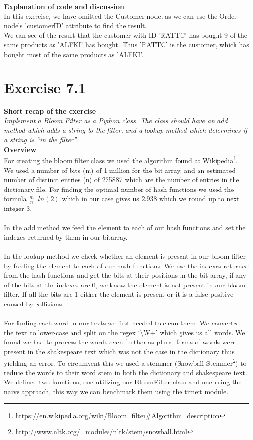 \documentclass{article}
\begin{document}
~\\
\textbf{Explanation of code and discussion}\\
In this exercise, we have omitted the Customer node, as we can use the Order node's 'customerID' attribute to find the result. 
~\\
We can see of the result that the customer with ID 'RATTC' has bought 9 of the same products as 'ALFKI' has bought. Thus 'RATTC' is the customer, which has bought most of the same products as 'ALFKI'. 

\section{Exercise 7.1}
\textbf{Short recap of the exercise}\\
\textit{Implement a Bloom Filter as a Python class. The class should have an add method which adds a string to the filter, and a lookup method which determines if a string is “in the filter”.}\\

\textbf{Overview}\\
For creating the bloom filter class we used the algorithm found at Wikipedia\footnote{\url{https://en.wikipedia.org/wiki/Bloom_filter#Algorithm_description}}.\\
We used a number of bits (m) of 1 million for the bit array, and an estimated number of distinct entries (n) of 235887 which are the number of entries in the dictionary file.
For finding the optimal number of hash functions we used the formula $\frac{m}{n} \cdot ln(2)$ which in our case gives us $2.938$ which we round up to next integer $3$.\\\\
In the add method we feed the element to each of our hash functions and set the indexes returned by them in our bitarray.\\\\
In the lookup method we check whether an element is present in our bloom filter by feeding the element to each of our hash functions. We use the indexes returned from the hash functions and get the bits at their positions in the bit array, if any of the bits at the indexes are 0, we know the element is not present in our bloom filter. If all the bits are 1 either the element is present or it is a false positive caused by collisions.\\\\
For finding each word in our texts we first needed to clean them. We converted the text to lower-case and split on the regex `\textbackslash W+' which gives us all words. We found we had to process the words even further as plural forms of words were present in the shakespeare text which was not the case in the dictionary thus yielding an error. To circumvent this we used a stemmer (Snowball Stemmer\footnote{\url{http://www.nltk.org/_modules/nltk/stem/snowball.html}}) to reduce the words to their word stem in both the dictionary and shakespeare text.\\
We defined two functions, one utilizing our BloomFilter class and one using the naive approach, this way we can benchmark them using the timeit module.\\
\end{document}
